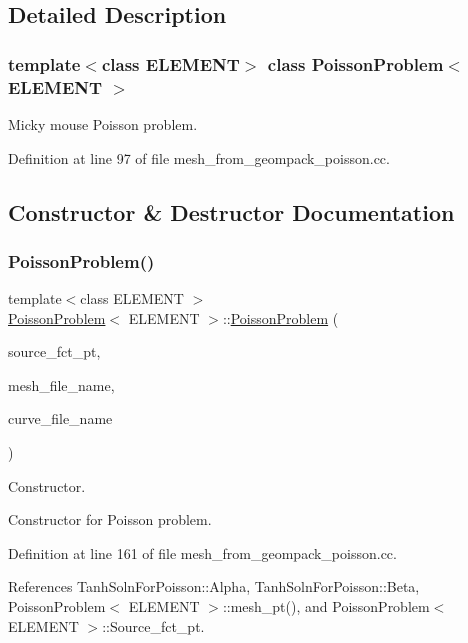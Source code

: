 \subsection{Detailed Description}
\subsubsection*{template$<$class E\+L\+E\+M\+E\+NT$>$\newline
class Poisson\+Problem$<$ E\+L\+E\+M\+E\+N\+T $>$}

Micky mouse Poisson problem. 

Definition at line 97 of file mesh\+\_\+from\+\_\+geompack\+\_\+poisson.\+cc.



\subsection{Constructor \& Destructor Documentation}
\mbox{\label{classPoissonProblem_a488c280759ef72e059de0fcd72cf4413}} 
\subsubsection{\texorpdfstring{Poisson\+Problem()}{PoissonProblem()}}
{\footnotesize\ttfamily template$<$class E\+L\+E\+M\+E\+NT $>$ \\
\hyperlink{classPoissonProblem}{Poisson\+Problem}$<$ E\+L\+E\+M\+E\+NT $>$\+::\hyperlink{classPoissonProblem}{Poisson\+Problem} (\begin{DoxyParamCaption}\item[{Poisson\+Equations$<$ 2 $>$\+::Poisson\+Source\+Fct\+Pt}]{source\+\_\+fct\+\_\+pt,  }\item[{const string \&}]{mesh\+\_\+file\+\_\+name,  }\item[{const string \&}]{curve\+\_\+file\+\_\+name }\end{DoxyParamCaption})}



Constructor. 

Constructor for Poisson problem. 

Definition at line 161 of file mesh\+\_\+from\+\_\+geompack\+\_\+poisson.\+cc.



References Tanh\+Soln\+For\+Poisson\+::\+Alpha, Tanh\+Soln\+For\+Poisson\+::\+Beta, Poisson\+Problem$<$ E\+L\+E\+M\+E\+N\+T $>$\+::mesh\+\_\+pt(), and Poisson\+Problem$<$ E\+L\+E\+M\+E\+N\+T $>$\+::\+Source\+\_\+fct\+\_\+pt.

